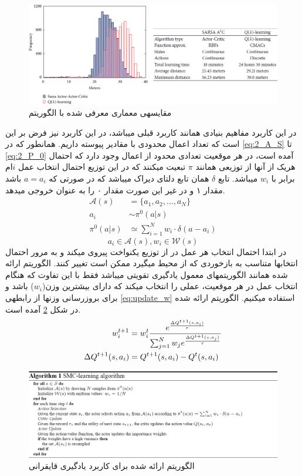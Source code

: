 \documentclass[10pt,a4paper]{article}
\newcommand{\نیمفاصله}{\halfspace}
\renewcommand{\ }{\halfspace}
\newcommand{\مق}{\lr}
\newcommand{\قم}{یادگیری تقویتی }
\newcommand{\ز}{\footnote{\lr{}}}
\begin{document}
\begin{figure}
\centering
\includegraphics[width=\textwidth]{res1_2}
\caption{مقایسه\ ی معماری معرفی شده با الگوریتم \مق{$Q(\lambda)$}}\label{fig:FA_res2}
\end{figure}
\clearpage
\زیرقسمت{یادگیری قایق\ رانی}
در این کاربرد
\cite{lazaric2007reinforcement}
مفاهیم بنیادی همانند کاربرد قبلی می\ باشد، در این کاربرد نیز فرض بر این است که تعداد اعمال محدودی با مقادیر پیوسته داریم. همان\ طور که در
\ref{eq:2_A_S} تا \ref{eq:2_P_0}
آمده است، در هر موقعیت تعدادی محدود از اعمال وجود دارد که احتمال هریک از آن\ ها از توزیعی همانند $\pi$ تبعیت می\ کنند که در این توزیع احتمال انتخاب عمل $i$ام برابر با $w_i$ می\ باشد. تابع $\delta$ همان تابع دلتای دیراک می\ باشد که در صورتی که $a = a_i$ باشد مقدار ۱ و در غیر این صورت مقدار ۰ را به عنوان خروجی می\ دهد.
\begin{align}
\mathcal{A}(s) &= \{a_1,a_2,\ldots,a_N\}\label{eq:2_A_S}\\
a_i &\sim \pi^{0}(a|s)\\
\pi^{0}(a|s) &\simeq \sum_{i=1}^{N}w_i\cdot\delta(a-a_i)\label{eq:2_P_0}
\end{align}
\[a_i \in \mathcal{A}(s), w_i\in\mathcal{W}(s)\]
در ابتدا احتمال انتخاب هر عمل در از توزیع یکنواخت پیروی می\ کند و به مرور احتمال انتخاب\ ها متناسب به بازخوردی که از محیط می\ گیرد ممکن است تغییر کنند. الگوریتم ارائه شده همانند الگوریتم\ های معمول \قم می\ باشد فقط با این تفاوت که هنگام انتخاب عمل در هر موقعیت، عملی را انتخاب می\ کند که دارای بیشترین وزن($w_i$) باشد و برای بروزرسانی وزن\ ها از رابطه\ ی
\ref{eq:update_w}
استفاده می\ کنیم. الگوریتم ارائه شده در شکل
\ref{fig:alg2}
آمده است.
\begin{align}
w_i^{t+1} &= w_i^t {e^{\Delta Q^{t+1}(s, a_i) \over \tau} \over \sum_{j = 1}^Nw_je^{\Delta Q^{t+1}(s, a_j) \over \tau}}\label{eq:update_w}\\
\Delta Q^{t+1}(s, a_i) &= Q^{t+1}(s, a_i) - Q^{t}(s, a_i)\nonumber
\end{align}
\begin{figure}
\centering
\includegraphics[width=\textwidth]{alg2}
\caption{الگوریتم ارائه شده برای کاربرد یادگیری قایق\ رانی}\label{fig:alg2}
\end{figure}
\end{document}
